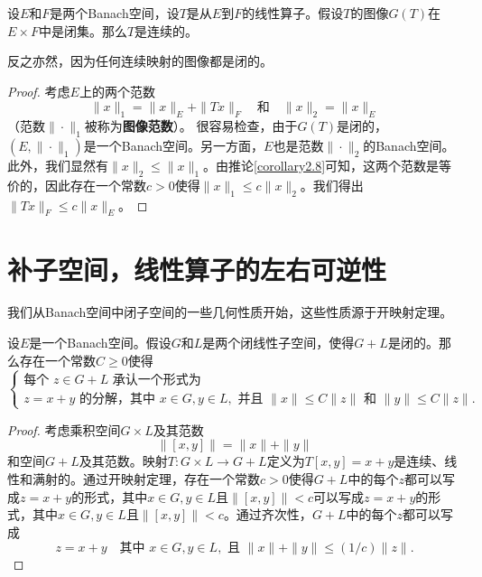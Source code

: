 \begin{theorem}[闭图像定理]\label{theorem2.9}
设$E$和$F$是两个Banach空间，设$T$是从$E$到$F$的线性算子。假设$T$的图像$G(T)$在$E \times F$中是闭集。那么$T$是连续的。
\end{theorem}

\begin{remark}
反之亦然，因为任何连续映射的图像都是闭的。
\end{remark}

\begin{proof}
考虑$E$上的两个范数
\[
\|x\|_1 = \|x\|_E + \|Tx\|_F \quad \text{和} \quad \|x\|_2 = \|x\|_E
\]
（范数$\|\cdot\|_1$被称为\textbf{图像范数}）。
很容易检查，由于$G(T)$是闭的，$(E, \|\cdot\|_1)$是一个Banach空间。另一方面，$E$也是范数$\|\cdot\|_2$的Banach空间。此外，我们显然有$\|x\|_2 \leq \|x\|_1$。由推论\ref{corollary2.8}可知，这两个范数是等价的，因此存在一个常数$c>0$使得$\|x\|_1 \leq c\|x\|_2$。我们得出$\|Tx\|_F \leq c\|x\|_E$。
\end{proof}

\section{补子空间，线性算子的左右可逆性}

我们从Banach空间中闭子空间的一些几何性质开始，这些性质源于开映射定理。

\begin{theorem}\label{theorem2.10}
设$E$是一个Banach空间。假设$G$和$L$是两个闭线性子空间，使得$G+L$是闭的。那么存在一个常数$C \geq 0$使得
\begin{equation}
\begin{cases}
\text{每个 } z \in G+L \text{ 承认一个形式为} \\
z = x+y \text{ 的分解，其中 } x \in G, y \in L, \text{ 并且 } \|x\| \leq C\|z\| \text{ 和 } \|y\| \leq C\|z\|.
\end{cases} \label{eq:2.13}
\end{equation}
\end{theorem}

\begin{proof}
考虑乘积空间$G \times L$及其范数
\[
\|[x,y]\| = \|x\| + \|y\|
\]
和空间$G+L$及其范数。映射$T: G \times L \to G+L$定义为$T[x,y] = x+y$是连续、线性和满射的。通过开映射定理，存在一个常数$c>0$使得$G+L$中的每个$z$都可以写成$z=x+y$的形式，其中$x \in G, y \in L$且$\|[x,y]\| < c$可以写成$z=x+y$的形式，其中$x \in G, y \in L$且$\|[x,y]\| < c$。通过齐次性，$G+L$中的每个$z$都可以写成
\[
z = x+y \quad \text{其中 } x \in G, y \in L, \text{ 且 } \|x\| + \|y\| \leq (1/c)\|z\|.
\]
\end{proof}

